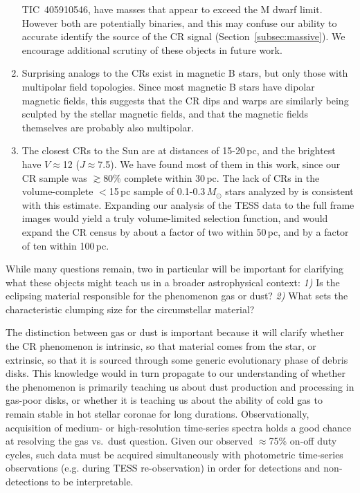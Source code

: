 \documentclass[11pt,twocolumn,tighten]{aastex63}
\begin{document}
\begin{enumerate}[leftmargin=*]
      TIC~405910546, have masses that appear to exceed the M dwarf
      limit.  However both are potentially binaries, and this may
      confuse our ability to accurate identify the source of the CR
      signal (Section~\ref{subsec:massive}).  We encourage additional
      scrutiny of these objects in future work.
    \item Surprising analogs to the CRs exist in magnetic B stars,
      but only those with multipolar field topologies.  Since most
      magnetic B stars have dipolar magnetic fields, this suggests
      that the CR dips and warps are similarly being sculpted by the
      stellar magnetic fields, and that the magnetic fields themselves
      are probably also multipolar.
    \item The closest CRs to the Sun are at distances of 15-20\,pc,
      and the brightest have $V$$\approx$12 ($J$$\approx$7.5).  We
      have found most of them in this work, since our CR sample was
      $\gtrsim$80\% complete within 30\,pc.  The lack of CRs in the
      volume-complete $<$15\,pc sample of 0.1-0.3\,$M_\odot$ stars
      analyzed by \citet{2021AJ....161...63W} is consistent with this
      estimate.  Expanding our analysis of the TESS data to the full
      frame images would yield a truly volume-limited selection
      function, and would expand the CR census by about a factor of
      two within 50\,pc, and by a factor of ten within 100\,pc.
\end{enumerate}

While many questions remain, two in particular will be important for
clarifying what these objects might teach us in a broader
astrophysical context: {\it 1)} Is the eclipsing material responsible
for the phenomenon gas or dust?  {\it 2)} What sets the characteristic
clumping size for the circumstellar material?

The distinction between gas or dust is important because it will
clarify whether the CR phenomenon is intrinsic, so that material
comes from the star, or extrinsic, so that it is sourced through some
generic evolutionary phase of debris disks.  This knowledge would in
turn propagate to our understanding of whether the phenomenon is
primarily teaching us about dust production and processing in gas-poor
disks, or whether it is teaching us about the ability of cold gas to
remain stable in hot stellar coronae for long durations.
Observationally, acquisition of medium- or high-resolution time-series
spectra holds a good chance at resolving the gas vs.~dust question.
Given our observed $\approx$75\% on-off duty cycles, such data must be
acquired simultaneously with photometric time-series observations
(e.g. during TESS re-observation) in order for detections and
non-detections to be interpretable.
\end{document}
